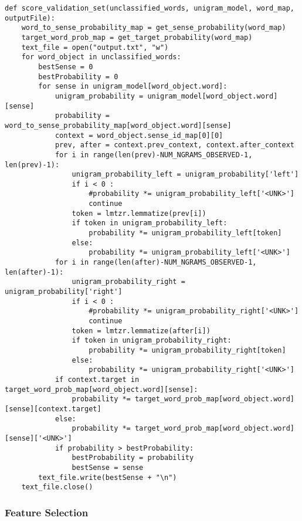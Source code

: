 \documentclass[11pt]{article}
\begin{document}
\begin{lstlisting}
def score_validation_set(unclassified_words, unigram_model, word_map, outputFile):
    word_to_sense_probability_map = get_sense_probability(word_map)
    target_word_prob_map = get_target_probability(word_map)
    text_file = open("output.txt", "w")
    for word_object in unclassified_words:
        bestSense = 0
        bestProbability = 0
        for sense in unigram_model[word_object.word]:
            unigram_probability = unigram_model[word_object.word][sense]
            probability = word_to_sense_probability_map[word_object.word][sense]
            context = word_object.sense_id_map[0][0]
            prev, after = context.prev_context, context.after_context
            for i in range(len(prev)-NUM_NGRAMS_OBSERVED-1, len(prev)-1):
                unigram_probability_left = unigram_probability['left']
                if i < 0 :
                    #probability *= unigram_probability_left['<UNK>']
                    continue
                token = lmtzr.lemmatize(prev[i])
                if token in unigram_probability_left:
                    probability *= unigram_probability_left[token]
                else:
                    probability *= unigram_probability_left['<UNK>']
            for i in range(len(after)-NUM_NGRAMS_OBSERVED-1, len(after)-1):
                unigram_probability_right = unigram_probability['right']
                if i < 0 :
                    #probability *= unigram_probability_right['<UNK>']
                    continue
                token = lmtzr.lemmatize(after[i])
                if token in unigram_probability_right:
                    probability *= unigram_probability_right[token]
                else:
                    probability *= unigram_probability_right['<UNK>']
            if context.target in target_word_prob_map[word_object.word][sense]:
                probability *= target_word_prob_map[word_object.word][sense][context.target]
            else:
                probability *= target_word_prob_map[word_object.word][sense]['<UNK>']
            if probability > bestProbability:
                bestProbability = probability
                bestSense = sense
        text_file.write(bestSense + "\n")
    text_file.close()
\end{lstlisting}		

\subsubsection{Feature Selection}
\end{document}
